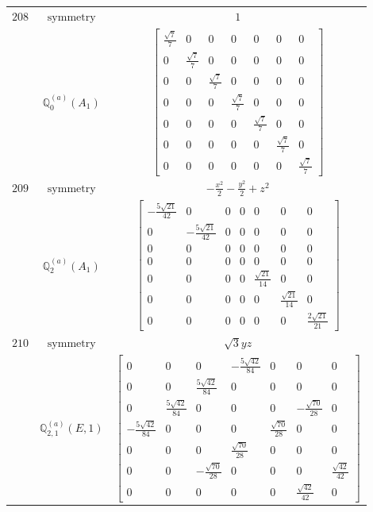 \documentclass[fleqn,8pt,landscape]{jsarticle}
\begin{document}
\begin{longtable}{ccc}
$ 208 $ & $ \text{symmetry} $ & $ 1 $ \\
$  $ & $ \mathbb{Q}_{0}^{(a)}(A_{1}) $ & $ \begin{bmatrix} \frac{\sqrt{7}}{7} & 0 & 0 & 0 & 0 & 0 & 0 \\ 0 & \frac{\sqrt{7}}{7} & 0 & 0 & 0 & 0 & 0 \\ 0 & 0 & \frac{\sqrt{7}}{7} & 0 & 0 & 0 & 0 \\ 0 & 0 & 0 & \frac{\sqrt{7}}{7} & 0 & 0 & 0 \\ 0 & 0 & 0 & 0 & \frac{\sqrt{7}}{7} & 0 & 0 \\ 0 & 0 & 0 & 0 & 0 & \frac{\sqrt{7}}{7} & 0 \\ 0 & 0 & 0 & 0 & 0 & 0 & \frac{\sqrt{7}}{7} \end{bmatrix} $ \\ \hline
$ 209 $ & $ \text{symmetry} $ & $ - \frac{x^{2}}{2} - \frac{y^{2}}{2} + z^{2} $ \\
$  $ & $ \mathbb{Q}_{2}^{(a)}(A_{1}) $ & $ \begin{bmatrix} - \frac{5 \sqrt{21}}{42} & 0 & 0 & 0 & 0 & 0 & 0 \\ 0 & - \frac{5 \sqrt{21}}{42} & 0 & 0 & 0 & 0 & 0 \\ 0 & 0 & 0 & 0 & 0 & 0 & 0 \\ 0 & 0 & 0 & 0 & 0 & 0 & 0 \\ 0 & 0 & 0 & 0 & \frac{\sqrt{21}}{14} & 0 & 0 \\ 0 & 0 & 0 & 0 & 0 & \frac{\sqrt{21}}{14} & 0 \\ 0 & 0 & 0 & 0 & 0 & 0 & \frac{2 \sqrt{21}}{21} \end{bmatrix} $ \\ \hline
$ 210 $ & $ \text{symmetry} $ & $ \sqrt{3} y z $ \\
$  $ & $ \mathbb{Q}_{2,1}^{(a)}(E,1) $ & $ \begin{bmatrix} 0 & 0 & 0 & - \frac{5 \sqrt{42}}{84} & 0 & 0 & 0 \\ 0 & 0 & \frac{5 \sqrt{42}}{84} & 0 & 0 & 0 & 0 \\ 0 & \frac{5 \sqrt{42}}{84} & 0 & 0 & 0 & - \frac{\sqrt{70}}{28} & 0 \\ - \frac{5 \sqrt{42}}{84} & 0 & 0 & 0 & \frac{\sqrt{70}}{28} & 0 & 0 \\ 0 & 0 & 0 & \frac{\sqrt{70}}{28} & 0 & 0 & 0 \\ 0 & 0 & - \frac{\sqrt{70}}{28} & 0 & 0 & 0 & \frac{\sqrt{42}}{42} \\ 0 & 0 & 0 & 0 & 0 & \frac{\sqrt{42}}{42} & 0 \end{bmatrix} $ \\ \hline

\end{longtable}
\end{document}
